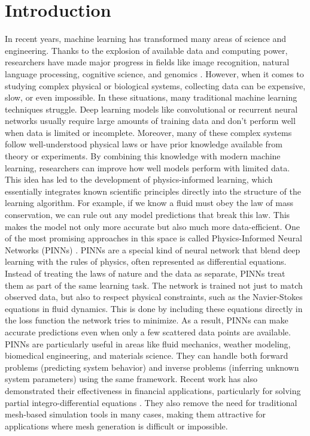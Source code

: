 \documentclass[11pt,twoside,openright]{report}
\begin{document}
\section{Introduction}
\label{sec:Resources}

In recent years, machine learning has transformed many areas of science and engineering. Thanks to the explosion of available data and computing power, researchers have made major progress in fields like image recognition, natural language processing, cognitive science, and genomics \cite{abadi2016tensorflow}. However, when it comes to studying complex physical or biological systems, collecting data can be expensive, slow, or even impossible. In these situations, many traditional machine learning techniques struggle. Deep learning models like convolutional or recurrent neural networks usually require large amounts of training data and don't perform well when data is limited or incomplete.
Moreover, many of these complex systems follow well-understood physical laws or have prior knowledge available from theory or experiments. By combining this knowledge with modern machine learning, researchers can improve how well models perform with limited data. This idea has led to the development of physics-informed learning, which essentially integrates known scientific principles directly into the structure of the learning algorithm. For example, if we know a fluid must obey the law of mass conservation, we can rule out any model predictions that break this law. This makes the model not only more accurate but also much more data-efficient.
One of the most promising approaches in this space is called Physics-Informed Neural Networks (PINNs) \cite{raissi2019physics}. PINNs are a special kind of neural network that blend deep learning with the rules of physics, often represented as differential equations. Instead of treating the laws of nature and the data as separate, PINNs treat them as part of the same learning task. The network is trained not just to match observed data, but also to respect physical constraints, such as the Navier-Stokes equations in fluid dynamics. This is done by including these equations directly in the loss function the network tries to minimize. As a result, PINNs can make accurate predictions even when only a few scattered data points are available.
PINNs are particularly useful in areas like fluid mechanics, weather modeling, biomedical engineering, and materials science. They can handle both forward problems (predicting system behavior) and inverse problems (inferring unknown system parameters) using the same framework. Recent work has also demonstrated their effectiveness in financial applications, particularly for solving partial integro-differential equations \cite{frey2022deep}. They also remove the need for traditional mesh-based simulation tools in many cases, making them attractive for applications where mesh generation is difficult or impossible.
\end{document}
